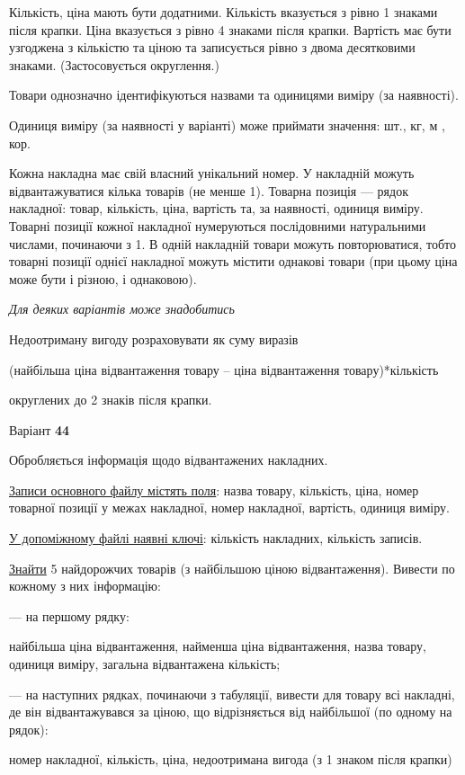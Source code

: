 \documentclass[11pt, ukrainian]{article}
\begin{document}
Кількість, ціна мають бути додатними.
Кількість вказується з рівно 1 знаками після крапки.
Ціна вказується з рівно 4 знаками після крапки.
Вартість має бути узгоджена з кількістю та ціною та записується рівно з двома десятковими знаками.
(Застосовується округлення.)

Товари однозначно ідентифікуються назвами та одиницями виміру (за наявності).

Одиниця виміру (за наявності у варіанті) може приймати значення: шт., кг, м , кор.

Кожна накладна має свій власний унікальний номер.
У накладній можуть відвантажуватися кілька товарів (не менше 1).
Товарна позиція --- рядок накладної: товар, кількість, ціна, вартість та, за наявності, одиниця виміру.
Товарні позиції кожної накладної нумеруються послідовними натуральними числами, починаючи з 1.
В одній накладній товари можуть повторюватися, 
тобто товарні позиції однієї накладної можуть містити однакові товари 
(при цьому ціна може бути і різною, і однаковою).

\bigskip\textit{Для деяких варіантів може знадобитись}

Недоотриману вигоду розраховувати як суму виразів
{\center (найбільша ціна відвантаження товару – ціна відвантаження товару)*кількість\par}

\bigskip
{\noindent} округлених до 2 знаків після крапки.




\par
\newpage
{\center Варіант  \No \textbf { 44 }\par}
\bigskip
Обробляється інформація щодо відвантажених накладних.

\underline{Записи основного файлу містять поля}: назва товару, кількість, ціна, номер товарної позиції у межах накладної, номер накладної, вартість, одиниця виміру.

\underline{У допоміжному файлі наявні ключі}: кількість накладних, кількість записів.

\underline{Знайти} 5 найдорожчих товарів (з найбільшою ціною відвантаження). Вивести по кожному з них інформацію:\par
{\noindent}--- на першому рядку:\par
найбільша ціна відвантаження, найменша ціна відвантаження, назва товару, одиниця виміру, загальна відвантажена кількість;

{\noindent}--- на наступних рядках, починаючи з табуляції, вивести для товару всі накладні, де він відвантажувався за ціною, що відрізняється від найбільшої (по одному на рядок):\par
номер накладної, кількість, ціна, недоотримана вигода (з 1 знаком після крапки)
\end{document}
